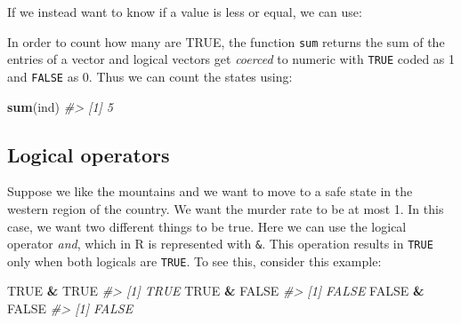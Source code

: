 \documentclass[
]{krantz}
\newenvironment{Shaded}{\begin{snugshade}}{\end{snugshade}}
\newcommand{\CommentTok}[1]{\textcolor[rgb]{0.37,0.37,0.37}{\textit{#1}}}
\newcommand{\FloatTok}[1]{\textcolor[rgb]{0.06,0.06,0.06}{#1}}
\newcommand{\KeywordTok}[1]{\textcolor[rgb]{0.27,0.27,0.27}{\textbf{#1}}}
\newcommand{\NormalTok}[1]{#1}
\newcommand{\OperatorTok}[1]{\textcolor[rgb]{0.43,0.43,0.43}{\textbf{#1}}}
\newcommand{\OtherTok}[1]{\textcolor[rgb]{0.37,0.37,0.37}{#1}}
\newcommand{\StringTok}[1]{\textcolor[rgb]{0.5,0.5,0.5}{#1}}
\begin{document}
\begin{Shaded}
\end{Shaded}

If we instead want to know if a value is less or equal, we can use:

\begin{Shaded}
\end{Shaded}

In order to count how many are TRUE, the function \texttt{sum} returns the sum of the entries of a vector and logical vectors get \emph{coerced} to numeric with \texttt{TRUE} coded as 1 and \texttt{FALSE} as 0. Thus we can count the states using:

\begin{Shaded}
\begin{Highlighting}[]
\KeywordTok{sum}\NormalTok{(ind)}
\CommentTok{#> [1] 5}
\end{Highlighting}
\end{Shaded}

\hypertarget{logical-operators}{%
\subsection{Logical operators}\label{logical-operators}}

Suppose we like the mountains and we want to move to a safe state in the western region of the country. We want the murder rate to be at most 1. In this case, we want two different things to be true. Here we can use the logical operator \emph{and}, which in R is represented with \texttt{\&}. This operation results in \texttt{TRUE} only when both logicals are \texttt{TRUE}. To see this, consider this example:

\begin{Shaded}
\begin{Highlighting}[]
\OtherTok{TRUE} \OperatorTok{&}\StringTok{ }\OtherTok{TRUE}
\CommentTok{#> [1] TRUE}
\OtherTok{TRUE} \OperatorTok{&}\StringTok{ }\OtherTok{FALSE}
\CommentTok{#> [1] FALSE}
\OtherTok{FALSE} \OperatorTok{&}\StringTok{ }\OtherTok{FALSE}
\CommentTok{#> [1] FALSE}
\end{Highlighting}
\end{Shaded}
\end{document}
